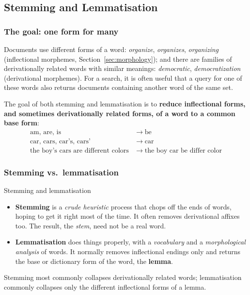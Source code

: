 \subsection{Stemming and Lemmatisation}
\label{sec:stemming-lemmatization}

\subsubsection{The goal: one form for many}

Documents use different forms of a word: \emph{organize}, \emph{organizes},
\emph{organizing} (inflectional morphemes, Section~\ref{sec:morphology}); and there are
families of derivationally related words with similar meanings: \emph{democratic},
\emph{democratization} (derivational morphemes). For a search, it is often useful that
a query for one of these words also returns documents containing another word of the
same set.

The goal of both stemming and lemmatisation is to \textbf{reduce inflectional forms, and
sometimes derivationally related forms, of a word to a common base form}:
\begin{align*}
  \text{am, are, is} &\;\to\; \text{be}\\
  \text{car, cars, car's, cars'} &\;\to\; \text{car}\\
  \text{the boy's cars are different colors} &\;\to\; \text{the boy car be differ color}
\end{align*}

\subsubsection{Stemming vs.\ lemmatisation}

\begin{nbdef}{Stemming and lemmatisation}
\begin{itemize}[nosep]
  \item \textbf{Stemming} is a \emph{crude heuristic} process that chops off the ends of
        words, hoping to get it right most of the time. It often removes derivational
        affixes too. The result, the \emph{stem}, need not be a real word.
  \item \textbf{Lemmatisation} does things properly, with a \emph{vocabulary} and a
        \emph{morphological analysis} of words. It normally removes inflectional endings
        only and returns the base or dictionary form of the word, the \textbf{lemma}.
\end{itemize}
Stemming most commonly collapses derivationally related words; lemmatisation commonly
collapses only the different inflectional forms of a lemma.
\end{nbdef}


